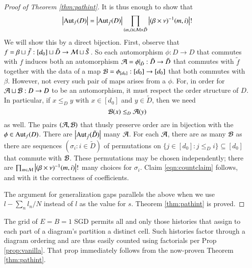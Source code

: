 \begin{proof}[Proof of Theorem \ref{thm:pathint}]
            It is thus enough to show that
            \begin{align*} \label{eqn:countclaim}
                \left|\text{\textnormal{Aut}}_f(D)\right| = 
                \left|\text{\textnormal{Aut}}_{\tilde f}(D)\right|
                \prod_{(m, i) \in \mathcal{M} \times \tilde D}
                    \left|(\beta \times \nu)^{-1}(m, i)\right|!
            \end{align*}
            We will show this by a direct bijection.  First, observe that
            $
                f = \beta \sqcup \tilde f:
                    [d_0] \sqcup \tilde D \to \mathcal{M} \sqcup \tilde S
            $. 
            So each automorphism $\phi: D\to D$ that commutes with $f$ induces
            both an automorphism
            $
                \mathcal{A} = \phi|_{\tilde D}: \tilde D\to \tilde D
            $
            that commutes with $\tilde f$ together with the data of a map
            $
                \mathcal{B} = \phi_{[d_0]}: [d_0] \to [d_0] 
            $
            that both commutes with $\beta$.  However, not every such pair of
            maps arises from a $\phi$.  For, in order for $\mathcal{A} \sqcup \mathcal{B}: D
            \to D$ to be an automorphism, it must respect the order structure
            of $D$.  In particular, if $x\leq_D y$ with $x \in [d_0]$ and $y
            \in \tilde D$, then we need
            $$
                \mathcal{B}(x) \leq_D \mathcal{A}(y)
            $$
            as well.  The
            pairs $(\mathcal{A}, \mathcal{B})$ that thusly preserve order are in bijection with
            the $\phi \in \text{\textnormal{Aut}}_f(D)$.  There are $\left|\text{\textnormal{Aut}}_{\tilde f}(\tilde
            D)\right|$ many $\mathcal{A}$.  For each $\mathcal{A}$, there are as many $\mathcal{B}$ as there
            are sequences $(\sigma_i: i \in \tilde D)$ of permutations on
            $
                \{j\in [d_0]: j\leq_D i\} \subseteq [d_0]
            $ 
            that commute with $\mathcal{B}$.  These permutations may be chosen
            independently; there are 
            $
                \prod_{m\in \mathcal{M}}
                    \left|(\beta \times \nu)^{-1}(m, i)\right|!
            $
            many choices for $\sigma_i$.  Claim \ref{eqn:countclaim} follows,
            and with it the correctness of coefficients.
 
            The argument for generalization gaps parallels the above when we
            use $l-\sum_n l_n/N$ instead of $l$ as the value for $s$. 
            Theorem \ref{thm:pathint} is proved.
        \end{proof}

        \begin{rmk}[The Case of $E=B=1$ SGD]
            The grid of $E=B=1$ SGD permits all and only those
            histories that assign to each part of a diagram's partition  a
            distinct cell.  Such histories factor through a diagram
            ordering and are thus easily counted using factorials per
            Prop \ref{prop:vanilla}.  That prop immediately
            follows from the now-proven Theorem \ref{thm:pathint}.
        \end{rmk}

